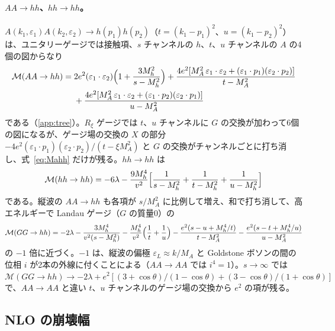 \documentclass[a4paper,10pt]{ltjsarticle}
\begin{document}
\paragraph{$AA\to hh$、$hh\to hh$。}$A(k_1,\varepsilon_1)A(k_2,\varepsilon_2)\to h(p_1)h(p_2)$（$t=(k_1-p_1)^2$、$u=(k_1-p_2)^2$）は、ユニタリーゲージでは接触項、$s$ チャンネルの $h$、$t$、$u$ チャンネルの $A$ の4個の図からなり
\begin{equation}
\begin{aligned}
\mathcal M(AA\to hh)={}&2e^2(\varepsilon_1\cdot\varepsilon_2)\Bigl(1+\frac{3M_h^2}{s-M_h^2}\Bigr)
+\frac{4e^2[M_A^2\,\varepsilon_1\cdot\varepsilon_2+(\varepsilon_1\cdot p_1)(\varepsilon_2\cdot p_2)]}{t-M_A^2}\\
&+\frac{4e^2[M_A^2\,\varepsilon_1\cdot\varepsilon_2+(\varepsilon_1\cdot p_2)(\varepsilon_2\cdot p_1)]}{u-M_A^2}
\end{aligned}
\label{eq:Mahh}
\end{equation}
である（\ref{app:tree}）。$R_\xi$ ゲージでは $t$、$u$ チャンネルに $G$ の交換が加わって6個の図になるが、ゲージ場の交換の $X$ の部分 $-4e^2(\varepsilon_1\cdot p_1)(\varepsilon_2\cdot p_2)/(t-\xi M_A^2)$ と $G$ の交換がチャンネルごとに打ち消し、式~\eqref{eq:Mahh} だけが残る。$hh\to hh$ は
\begin{equation}
\mathcal M(hh\to hh)=-6\lambda-\frac{9M_h^4}{v^2}\Bigl[\frac1{s-M_h^2}+\frac1{t-M_h^2}+\frac1{u-M_h^2}\Bigr]
\label{eq:Mhh}
\end{equation}
である。縦波の $AA\to hh$ も各項が $s/M_A^2$ に比例して増え、和で打ち消して、高エネルギーで Landau ゲージ（$G$ の質量0）の
\begin{equation}
\mathcal M(GG\to hh)=-2\lambda-\frac{3M_h^4}{v^2(s-M_h^2)}-\frac{M_h^4}{v^2}\Bigl(\frac1t+\frac1u\Bigr)
-\frac{e^2(s-u+M_h^4/t)}{t-M_A^2}-\frac{e^2(s-t+M_h^4/u)}{u-M_A^2}
\label{eq:Mgghh}
\end{equation}
の $-1$ 倍に近づく。$-1$ は、縦波の偏極 $\varepsilon_L\approx k/M_A$ と Goldstone ボソンの間の位相 $i$ が2本の外線に付くことによる（$AA\to AA$ では $i^4=1$）。$s\to\infty$ では $\mathcal M(GG\to hh)\to-2\lambda+e^2[(3+\cos\theta)/(1-\cos\theta)+(3-\cos\theta)/(1+\cos\theta)]$ で、$AA\to AA$ と違い $t$、$u$ チャンネルのゲージ場の交換から $e^2$ の項が残る。

\subsection{NLO の崩壊幅}\label{sec:nlo}
\end{document}
